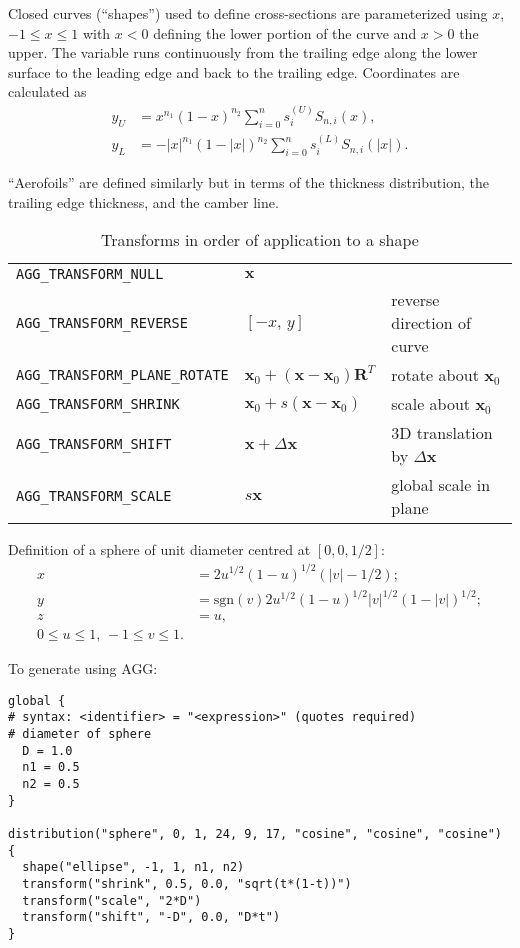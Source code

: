 \documentclass[a4paper,12pt]{article}
\newcommand{\sgn}{\mathrm{sgn}}
\begin{document}
Closed curves (``shapes'') used to define cross-sections are
parameterized using $x$, $-1\leq x \leq 1$ with $x<0$ defining the
lower portion of the curve and $x>0$ the upper. The variable runs
continuously from the trailing edge along the lower surface to the
leading edge and back to the trailing edge. Coordinates are calculated
as
\begin{align}
  \label{equ:curves}
  y_{U} &= x^{n_{1}}(1-x)^{n_{2}}\sum_{i=0}^{n} s_{i}^{(U)}S_{n,i}(x),\\
  y_{L} &= -|x|^{n_{1}}(1-|x|)^{n_{2}}\sum_{i=0}^{n} s_{i}^{(L)}S_{n,i}(|x|).
\end{align}

``Aerofoils'' are defined similarly but in terms of the thickness
distribution, the trailing edge thickness, and the camber line. 

\begin{table}
  \centering
  \begin{tabular}{lll}
    \verb+AGG_TRANSFORM_NULL+  & $\mathbf{x}$& \\
    \verb+AGG_TRANSFORM_REVERSE+  & $[-x,\, y]$ & reverse direction of curve\\
    \verb+AGG_TRANSFORM_PLANE_ROTATE+  &
    $
    \displaystyle
    \mathbf{x}_{0} +
    (\mathbf{x}-\mathbf{x}_{0})\mathbf{R}^{T}
    $
    &
    rotate about $\mathbf{x}_{0}$\\
    \verb+AGG_TRANSFORM_SHRINK+  &
    $\displaystyle\mathbf{x}_{0} + s(\mathbf{x}-\mathbf{x}_{0})$
    & scale about $\mathbf{x}_{0}$\\
    \verb+AGG_TRANSFORM_SHIFT+  & $\mathbf{x} + \Delta\mathbf{x}$&
    3D translation by $\Delta \mathbf{x}$\\
    \verb+AGG_TRANSFORM_SCALE+  & $s\textbf{x}$& global scale in plane
    \\
  \end{tabular}
  \caption{Transforms in order of application to a shape}
  \label{tab:transforms}
\end{table}

Definition of a sphere of unit diameter centred at $[0,0,1/2]$:
\begin{subequations}
  \label{equ:sphere}
  \begin{align}
    x &= 2u^{1/2}(1-u)^{1/2}(|v|-1/2);\\
    y &= \sgn(v)2u^{1/2}(1-u)^{1/2}|v|^{1/2}(1-|v|)^{1/2};\\
    z &= u,\\
    0\leq u\leq 1,\,-1\leq v\leq 1.\nonumber
  \end{align}
\end{subequations}

To generate using AGG:
\begin{verbatim}
global {
# syntax: <identifier> = "<expression>" (quotes required)
# diameter of sphere
  D = 1.0
  n1 = 0.5
  n2 = 0.5
}

distribution("sphere", 0, 1, 24, 9, 17, "cosine", "cosine", "cosine")
{
  shape("ellipse", -1, 1, n1, n2) 
  transform("shrink", 0.5, 0.0, "sqrt(t*(1-t))")
  transform("scale", "2*D")
  transform("shift", "-D", 0.0, "D*t")
}
\end{verbatim}
\end{document}
